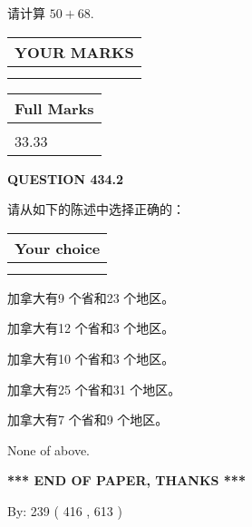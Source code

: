 \documentclass{ctexart}
\begin{document}
  
 
请计算 $ %
50 +  %
68 $.
 

 

 
  
\vspace{0.2in}
  
\noindent\begin{tabular}{|l|}
\hline
 YOUR MARKS  \\
\hline
 \\ 
 \\ 
\hline
\end{tabular}
\hspace{0.05in} \begin{tabular}{|l|}
\hline
 Full Marks  \\
\hline
 \\ 
33.33 \\
\hline
\end{tabular}
{\textbf{\Large{QUESTION
434.2 
}}}
  
  
请从如下的陈述中选择正确的：
  
  
\noindent\hspace{3.0in} \begin{tabular}{|l|}
\hline
Your choice \\
\hline
 \\ 
 \\ 
\hline
\end{tabular}
  
  
 
 
加拿大有9 个省和23 个地区。
 
 
加拿大有12 个省和3 个地区。
 
 
加拿大有10 个省和3 个地区。
 
 
加拿大有25 个省和31 个地区。
 
 
加拿大有7 个省和9 个地区。
 
 
 None of above.
 
 
   
   
 \vspace{0.2in}
 
   
   
   
   
\vspace{1.0in} 
{\textbf{\large{ *** END OF PAPER, THANKS *** }}} 
   
   
\hspace{1.0in} By: 
 239 ( 416 ,  613 )
   
\end{document}

